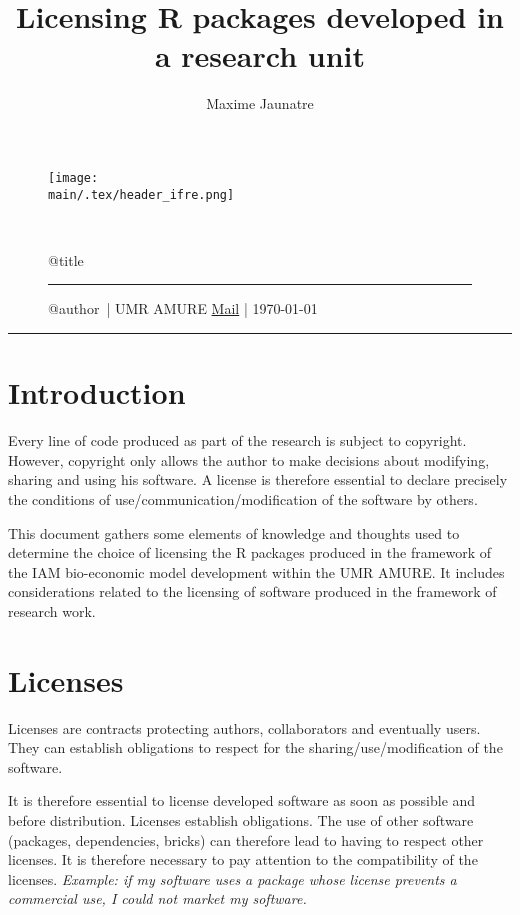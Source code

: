 \documentclass[12pt, colorinlistoftodos]{article}
\title{Licensing R packages developed in a research unit}
\author{Maxime Jaunatre}
\providecommand{\main}{.}  %
\begin{document}
\thispagestyle{plain}

\begin{figure}
    \texttt{[image: \\main/.tex/header\_ifre.png]}
    \par ~ \par
    \begin{minipage}{\textwidth}
        \begin{center}
            {\huge \csname @title\endcsname }
        \end{center}
        \rule{7em}{.4pt}\par
        \csname @author\endcsname ~| UMR AMURE \hfill %
        \href{mailto:maxime.jaunatre@ifremer.fr}{Mail} | \today
    \end{minipage}
\end{figure}
\hrule

\section{Introduction}

Every line of code produced as part of the research is subject to copyright. 
However, copyright only allows the author to make decisions about modifying, sharing and using his software.
A license is therefore essential to declare precisely the conditions of use/communication/modification of the software by others.

This document gathers some elements of knowledge and thoughts used to determine the choice of licensing the R packages produced in the framework of the IAM bio-economic model development within the UMR AMURE. 
It includes considerations related to the licensing of software produced in the framework of research work.

\section{Licenses}

Licenses are contracts protecting authors, collaborators and eventually users. 
They can establish obligations to respect for the sharing/use/modification of the software.

It is therefore essential to license developed software as soon as possible and before distribution.
Licenses establish obligations. The use of other software (packages, dependencies, bricks)
can therefore lead to having to respect other licenses.
It is therefore necessary to pay attention to the compatibility of the licenses.
\textit{Example: if my software uses a package whose license prevents a commercial use, I could not market my software.}
\end{document}
